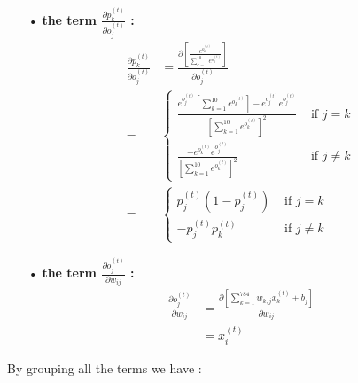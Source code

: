 \documentclass{article}
\begin{document}
\begin{itemize}
\item[•]\textbf{ the term $\frac{\partial  p^{(t)}_{k}}{\partial o^{(t)}_{j}}$ : }
\begin{align*}
\frac{\partial  p^{(t)}_{k}}{\partial o^{(t)}_{j}} &= \frac{\partial \left[ \frac{e^{o^{(t)}_{k}}}{\sum_{k=1}^{10}e^{o^{(t)}_{k}}} \right] }{\partial o^{(t)}_{j}}\\
=&
\begin{cases}
\frac{
e^{o^{(t)}_{j}}\left[\sum_{k=1}^{10}e^{o^{(t)}_{k}}\right] - e^{o^{(t)}_{j}}e^{o^{(t)}_{j}}
}{\left[\sum_{k=1}^{10}e^{o^{(t)}_{k}}\right]^2}
& \text{ if } j=k \\
\frac{ - e^{o^{(t)}_{k}}e^{o^{(t)}_{j}}
}{\left[\sum_{k=1}^{10}e^{o^{(t)}_{k}}\right]^2}
& \text{ if } j \neq k
\end{cases}\\
=&
\begin{cases}
p^{(t)}_{j}(1-p^{(t)}_{j})
& \text{ if } j=k \\
-p^{(t)}_{j}p^{(t)}_{k}
& \text{ if } j \neq k
\end{cases}
\end{align*}
\item[•]\textbf{ the term $\frac{\partial  o^{(t)}_{j}}{\partial w_{ij}}$ : }
\begin{align*}
\frac{\partial  o^{(t)}_{j}}{\partial w_{ij}} &= \frac{\partial  \left[
\sum_{k=1}^{784}w_{k,j}x_{k}^{(t)} + b_j \right]}{\partial w_{ij}}  \\
&= x_{i}^{(t)}
\end{align*}
\end{itemize}
By grouping  all the  terms we have :
\end{document}
